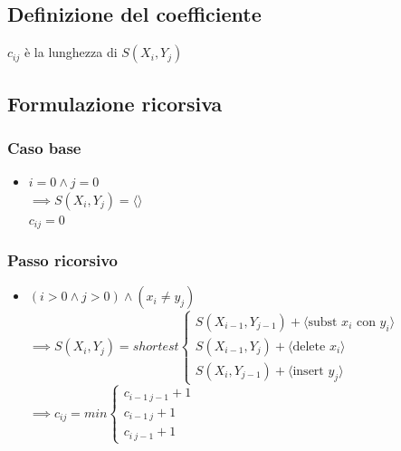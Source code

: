 \subsection{Definizione del coefficiente}
$c_{ij}$ è la lunghezza di $S(X_i, Y_j)$

\subsection{Formulazione ricorsiva}
\subsubsection{Caso base}
\begin{itemize}
    \item $i = 0 \land j=0$\\
    $\implies S(X_i, Y_j) = \langle \rangle$\\
    $c_{ij} = 0$
\end{itemize}

\subsubsection{Passo ricorsivo}
\begin{itemize}
    \item $(i > 0 \land j > 0) \land (x_i \not = y_j)$ \\
    $\implies S(X_i, Y_j) = shortest 
    \begin{cases}
        S(X_{i-1}, Y_{j-1}) + \langle \text{subst } x_i \text{ con } y_i \rangle \\
        S(X_{i-1},Y_j) + \langle \text{delete } x_i\rangle \\
        S(X_i, Y_{j-1}) + \langle \text{insert } y_j \rangle
    \end{cases}
    $ \\
    $\implies c_{ij} = min 
    \begin{cases}
        c_{i-1\ j-1} + 1 \\
        c_{i-1\ j} + 1 \\
        c_{i\ j-1} + 1    
    \end{cases}
    $
\end{itemize}